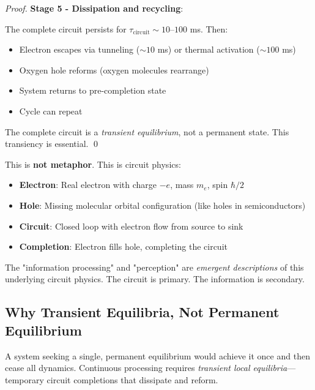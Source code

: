 \begin{proof}
\textbf{Stage 5 - Dissipation and recycling}:

The complete circuit persists for $\tau_{\text{circuit}} \sim 10$--$100$ ms. Then:
\begin{itemize}
\item Electron escapes via tunneling ($\sim 10$ ms) or thermal activation ($\sim 100$ ms)
\item Oxygen hole reforms (oxygen molecules rearrange)
\item System returns to pre-completion state
\item Cycle can repeat
\end{itemize}

The complete circuit is a \textit{transient equilibrium}, not a permanent state. This transiency is essential. \qed
\end{proof}

\begin{remark}
This is \textbf{not metaphor}. This is circuit physics:

\begin{itemize}
\item \textbf{Electron}: Real electron with charge $-e$, mass $m_e$, spin $\hbar/2$
\item \textbf{Hole}: Missing molecular orbital configuration (like holes in semiconductors)
\item \textbf{Circuit}: Closed loop with electron flow from source to sink
\item \textbf{Completion}: Electron fills hole, completing the circuit
\end{itemize}

The "information processing" and "perception" are \textit{emergent descriptions} of this underlying circuit physics. The circuit is primary. The information is secondary.
\end{remark}

\subsection{Why Transient Equilibria, Not Permanent Equilibrium}

\begin{theorem}
\label{thm:transient_necessity}
A system seeking a single, permanent equilibrium would achieve it once and then cease all dynamics. Continuous processing requires \textit{transient local equilibria}—temporary circuit completions that dissipate and reform.
\end{theorem}

